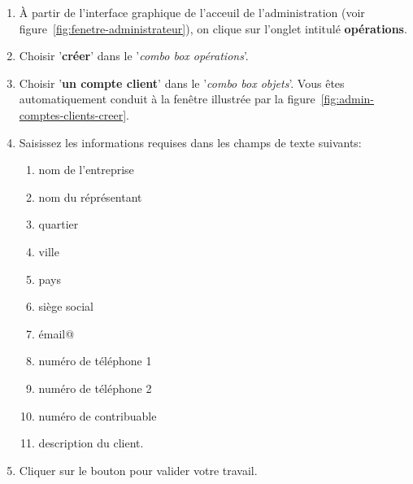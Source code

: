 \begin{enumerate}[1)]
	\item \`A partir de l'interface graphique de l'acceuil de
		l'administration (voir figure~\ref{fig:fenetre-administrateur}),
		on clique sur l'onglet intitul\'e \textbf{op\'erations}. 
		
	\item Choisir '\textbf{cr\'eer}' dans le '\emph{combo box
		op\'erations}'.
		
	\item Choisir '\textbf{un compte client}' dans
		le '\emph{combo box objets}'. Vous \^etes automatiquement
		conduit \`a la fen\^etre illustr\'ee par la
		figure~\ref{fig:admin-comptes-clients-creer}.
		
	\item Saisissez les informations requises dans les champs de texte
		suivants:
		\begin{enumerate}[1)]
			\item nom de l'entreprise
			\item nom du r\'epr\'esentant
			\item quartier \optionel
			\item ville \optionel
			\item pays \optionel
			\item si\`ege social \optionel
			\item \'email@ \optionel
			\item num\'ero de t\'el\'ephone 1 \optionel
			\item num\'ero de t\'el\'ephone 2 \optionel
			\item num\'ero de contribuable \optionel
			\item description du client. \optionel			
		\end{enumerate}
		
	\item Cliquer sur le bouton  pour
		valider votre travail.		
\end{enumerate}


\newpage
{}\label{sec:administration-comptes-clients-lister}

